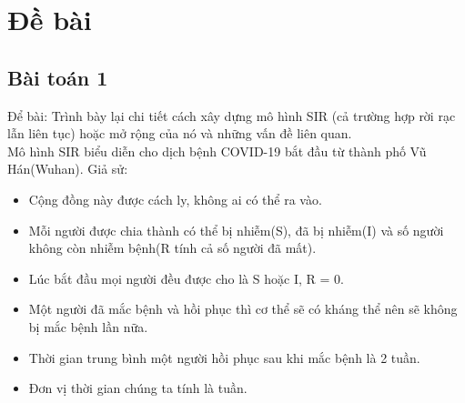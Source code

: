 \documentclass[a4paper]{article}
\begin{document}
\section{Đề bài}\label{bai_tap}
\subsection{Bài toán 1}
Để bài: Trình bày lại chi tiết cách xây dựng mô hình SIR (cả trường hợp rời rạc lẫn liên tục) hoặc mở rộng của nó và những vấn đề liên quan.
\\
Mô hình SIR biểu diễn cho dịch bệnh COVID-19 bắt đầu từ thành phố Vũ Hán(Wuhan). 
Giả sử:
\begin{itemize}
 \item Cộng đồng này được cách ly, không ai có thể ra vào.
 \item Mỗi người được chia thành có thể bị nhiễm(S), đã bị nhiễm(I) và số người không còn nhiễm bệnh(R tính cả số người đã mất).
 \item Lúc bắt đầu mọi người đều được cho là S hoặc I, R = 0.
 \item Một người đã mắc bệnh và hồi phục thì cơ thể sẽ có kháng thể nên sẽ không bị mắc bệnh lần nữa.
 \item Thời gian trung bình một người hồi phục sau khi mắc bệnh là 2 tuần.
 \item Đơn vị thời gian chúng ta tính là tuần.
\end{itemize}
\end{document}
